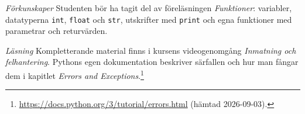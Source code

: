 \emph{Förkunskaper}
Studenten bör ha tagit del av föreläsningen \emph{Funktioner}:
variabler, datatyperna \texttt{int}, \texttt{float}
och \texttt{str}, utskrifter med \texttt{print}
och egna funktioner med parametrar och returvärden.

\emph{Läsning}
Kompletterande material finns i kursens videogenomgång \emph{Inmatning
och felhantering}.  Pythons egen dokumentation beskriver särfallen och
hur man fångar dem i kapitlet
\emph{Errors and Exceptions}.\footnote{\label{fn:pydoc}%
  \url{https://docs.python.org/3/tutorial/errors.html} (hämtad
  2026-09-03).}
